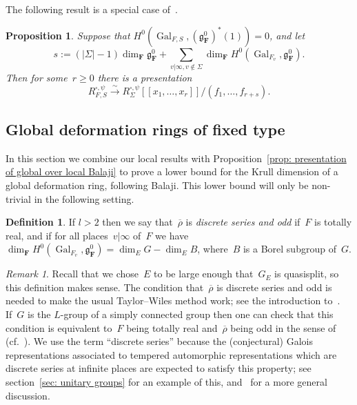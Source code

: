 \documentclass{amsart}
\renewcommand{\mathbb}{\mathbf}
\def\fz{\mathfrak{z}}
\def\fg{\mathfrak{g}}
\newcommand{\To}{\longrightarrow}
\newcommand{\isoto}{\stackrel{\sim}{\To}}
\newtheorem{prop}[subsubsection]{Proposition}
\theoremstyle{definition}
\newtheorem{defn}[subsubsection]{Definition}
\theoremstyle{remark}
\newtheorem{rem}[subsubsection]{Remark}
\newcommand{\mar}[1]{}
\newcommand{\mar}[1]{\marginpar{\raggedright\tiny squirrel #1}}
\newcommand{\F}{\FF}
\newcommand{\FF}{{\mathbb F}}
\DeclareMathOperator{\Gal}{Gal}
\newcommand{\rhobar}{\overline{\rho}}
\begin{document}
The following result is a special case of~\cite[Prop.\ 4.2.5]{MR3152673}.

\begin{prop}
  \label{prop: presentation of global over local Balaji}Suppose that
  $H^0(\Gal_{F,S},(\fg_\F^0)^*(1))=0$, and %
  let \[s:=(|\Sigma|-1)\dim_{\F}\fg_\F^0
    +\sum_{v|\infty,v\notin\Sigma}\dim_\F H^0(\Gal_{F_v},\fg_\F^0). \] Then for some~$r\ge 0$ there is a
  presentation \[R_{F,S}^{\square,\psi}\isoto R_{\Sigma}^{\square,\psi}[\![x_1,\dots,x_r]\!]/(f_1,\dots,f_{r+s}).\]
\end{prop}


\subsection{Global deformation rings of fixed type}\label{subsec:
  Balaji with types}In this section we combine our local results with Proposition~\ref{prop:
  presentation of global over local Balaji} to prove a lower bound for
the Krull dimension of a global deformation ring, following Balaji. This lower bound
will only be non-trivial in the following setting. 

\begin{defn}
  \label{defn: oddness}If $l>2$ then we say that~$\rhobar$ is \emph{discrete series
    and odd} if~$F$ is totally real, and if for all places~$v|\infty$
  of~$F$ we have $\dim_\F H^0(\Gal_{F_v},\fg_\F^0)=\dim_E G-\dim_EB$,
  where~$B$ is a Borel subgroup of~$G$.
\end{defn}
\begin{rem}
  \label{rem: relationship to other definitions of oddness}Recall that
  we chose~$E$ to be large enough that~$G_E$ is quasisplit, so this
  definition makes sense. The
  condition that~$\rhobar$ is discrete series and odd is  needed to make
  the usual Taylor--Wiles method work; see the introduction
  to~\cite{CHT}. If~$G$ is the $L$-group of a simply connected
  group %
  then one can check that this condition is equivalent to~$F$ being
  totally real and~$\rhobar$ being odd in the sense of~\cite{grossodd}
  (cf.\ \cite[Lem.\ 4.3.1]{MR3152673}). We use the term ``discrete
  series'' because the (conjectural) Galois representations associated
  to tempered automorphic representations which are discrete series at
  infinite places are expected to satisfy this property; see
  section~\ref{sec: unitary groups} for an example of this,
  and~\cite{grossodd} for a more general discussion.
\end{rem}
\end{document}
